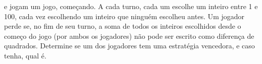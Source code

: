   e  jogam um jogo,  começando. A cada turno, cada um escolhe um inteiro entre 1 e 100, cada vez escolhendo um inteiro que ninguém escolheu antes. Um jogador perde se, no fim de seu turno, a soma de todos os inteiros escolhidos desde o começo do jogo (por ambos os jogadores) não pode ser escrito como diferença de quadrados. Determine se um dos jogadores tem uma estratégia vencedora, e caso tenha, qual é.